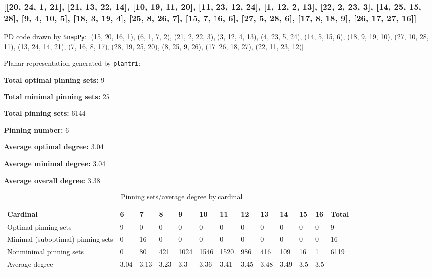 \documentclass{article}%
\begin{document}
\newpage

\subsubsection{[[20, 24, 1, 21], [21, 13, 22, 14], [10, 19, 11, 20], [11, 23, 12, 24], [1, 12, 2, 13], [22, 2, 23, 3], [14, 25, 15, 28], [9, 4, 10, 5], [18, 3, 19, 4], [25, 8, 26, 7], [15, 7, 16, 6], [27, 5, 28, 6], [17, 8, 18, 9], [26, 17, 27, 16]]}

{\small\noindent PD code drawn by \texttt{SnapPy}: [(15, 20, 16, 1), (6, 1, 7, 2), (21, 2, 22, 3), (3, 12, 4, 13), (4, 23, 5, 24), (14, 5, 15, 6), (18, 9, 19, 10), (27, 10, 28, 11), (13, 24, 14, 21), (7, 16, 8, 17), (28, 19, 25, 20), (8, 25, 9, 26), (17, 26, 18, 27), (22, 11, 23, 12)]}

{\small\noindent Planar representation generated by \texttt{plantri}: -}

\begin{multicols}{2}
{\normalsize \noindent\textbf{Total optimal pinning sets:} 9

\noindent\textbf{Total minimal pinning sets:} 25

\noindent\textbf{Total pinning sets:} 6144

\noindent\textbf{Pinning number:} 6

}
\columnbreak

{\normalsize \noindent\textbf{Average optimal degree:} 3.04

\noindent\textbf{Average minimal degree:} 3.04

\noindent\textbf{Average overall degree:} 3.38

}
\end{multicols}

\begin{table}[ht]
	\caption{Pinning sets/average degree by cardinal}
	\centering
	\renewcommand{\arraystretch}{1.5}
	\begin{tabularx}{\textwidth}{lXXXXXXXXXXXXX}
		\toprule
			Cardinal & 6 & 7 & 8 & 9 & 10 & 11 & 12 & 13 & 14 & 15 & 16 & Total\\
			\hline
			Optimal pinning sets & 9 & 0 & 0 & 0 & 0 & 0 & 0 & 0 & 0 & 0 & 0 & 9 \\
			Minimal (suboptimal) pinning sets & 0 & 16 & 0 & 0 & 0 & 0 & 0 & 0 & 0 & 0 & 0 & 16 \\
			Nonminimal pinning sets & 0 & 80 & 421 & 1024 & 1546 & 1520 & 986 & 416 & 109 & 16 & 1 & 6119 \\
			Average degree & 3.04 & 3.13 & 3.23 & 3.3 & 3.36 & 3.41 & 3.45 & 3.48 & 3.49 & 3.5 & 3.5 &  \\
		\bottomrule \\ 
	\end{tabularx}
\end{table}
\end{document}
